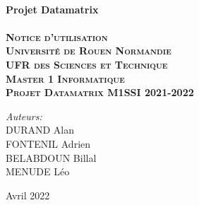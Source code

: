 \begin{titlepage}

\center %



\HRule \\[0.4cm]
{ \huge \bfseries Projet Datamatrix}\\[0.4cm] %
\HRule \\[1.5cm]

\textsc{\huge \textbf{Notice d'utilisation}}\\[1.5cm]

\textsc{\Large \textbf{Université de Rouen Normandie \\[0.07cm] UFR des Sciences et Technique \\[1,5cm] Master 1 Informatique\\[0.5cm] Projet Datamatrix M1SSI 2021-2022}}


\vspace{3cm}

\begin{center} \large
\Large \emph{Auteurs:}\\[0.1cm]
\Large DURAND Alan\\
\Large FONTENIL Adrien\\
\large BELABDOUN Billal\\
\large MENUDE Léo
\end{center}
\vspace{1cm}


{\large Avril 2022}\\[1cm]

\vfill %

\end{titlepage}